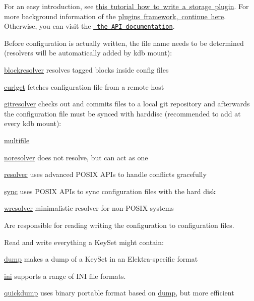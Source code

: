 For an easy introduction, see \mbox{\hyperlink{doc_tutorials_plugins_md}{this tutorial how to write a storage plugin}}. For more background information of the \mbox{\hyperlink{doc_dev_plugins-framework_md}{plugins framework, continue here}}. Otherwise, you can visit the \href{https://doc.libelektra.org/api/current/html/group__plugin.html}{\texttt{ the A\+PI documentation}}.

Before configuration is actually written, the file name needs to be determined (resolvers will be automatically added by kdb mount)\+:


\begin{DoxyItemize}
\item \mbox{\hyperlink{autotoc_md65_src_plugins_blockresolver_README_md}{blockresolver}} resolves tagged blocks inside config files
\item \mbox{\hyperlink{autotoc_md150_src_plugins_curlget_README_md}{curlget}} fetches configuration file from a remote host
\item \mbox{\hyperlink{autotoc_md239_src_plugins_gitresolver_README_md}{gitresolver}} checks out and commits files to a local git repository and afterwards the configuration file must be synced with harddisc (recommended to add at every kdb mount)\+:
\item \mbox{\hyperlink{autotoc_md479_src_plugins_multifile_README_md}{multifile}}
\item \mbox{\hyperlink{autotoc_md510_src_plugins_noresolver_README_md}{noresolver}} does not resolve, but can act as one
\item \mbox{\hyperlink{autotoc_md618_src_plugins_resolver_README_md}{resolver}} uses advanced P\+O\+S\+IX A\+P\+Is to handle conflicts gracefully
\item \mbox{\hyperlink{autotoc_md663_src_plugins_sync_README_md}{sync}} uses P\+O\+S\+IX A\+P\+Is to sync configuration files with the hard disk
\item \mbox{\hyperlink{autotoc_md715_src_plugins_wresolver_README_md}{wresolver}} minimalistic resolver for non-\/\+P\+O\+S\+IX systems
\end{DoxyItemize}

Are responsible for reading writing the configuration to configuration files.

Read and write everything a Key\+Set might contain\+:


\begin{DoxyItemize}
\item \mbox{\hyperlink{autotoc_md198_src_plugins_dump_README_md}{dump}} makes a dump of a Key\+Set in an Elektra-\/specific format
\item \mbox{\hyperlink{autotoc_md292_src_plugins_ini_README_md}{ini}} supports a range of I\+NI file formats.
\item \mbox{\hyperlink{autotoc_md561_src_plugins_quickdump_README_md}{quickdump}} uses binary portable format based on \mbox{\hyperlink{autotoc_md198_src_plugins_dump_README_md}{dump}}, but more efficient
\end{DoxyItemize}

